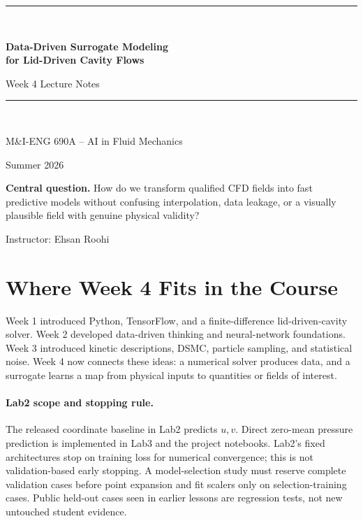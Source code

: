 \documentclass[11pt]{article}
\begin{document}
\begin{titlepage}
\centering
\vspace*{1.1cm}
{\color{black}\rule{\textwidth}{2pt}}\\[0.5cm]
{\Huge\bfseries Data-Driven Surrogate Modeling\\[0.18cm]
for Lid-Driven Cavity Flows\par}
\vspace{0.35cm}
{\Large Week 4 Lecture Notes\par}
\vspace{0.5cm}
{\color{black}\rule{\textwidth}{2pt}}\\[1.0cm]
{\Large M\&I-ENG 690A -- AI in Fluid Mechanics\par}
\vspace{0.3cm}
{\large Summer 2026\par}
\vfill
\begin{tcolorbox}[colback=lightblue,colframe=blue,width=0.92\textwidth]
\textbf{Central question.} How do we transform qualified CFD fields into fast predictive models without confusing interpolation, data leakage, or a visually plausible field with genuine physical validity?
\end{tcolorbox}
\vfill
{\large Instructor: Ehsan Roohi\par}
\end{titlepage}

\tableofcontents
\newpage

\section{Where Week 4 Fits in the Course}
Week 1 introduced Python, TensorFlow, and a finite-difference lid-driven-cavity solver. Week 2 developed data-driven thinking and neural-network foundations. Week 3 introduced kinetic descriptions, DSMC, particle sampling, and statistical noise. Week 4 now connects these ideas: a numerical solver produces data, and a surrogate learns a map from physical inputs to quantities or fields of interest.

\paragraph{Lab2 scope and stopping rule.}
The released coordinate baseline in Lab2 predicts $u,v$. Direct zero-mean pressure
prediction is implemented in Lab3 and the project notebooks. Lab2's fixed
architectures stop on training loss for numerical convergence; this is not
validation-based early stopping. A model-selection study must reserve complete
validation cases before point expansion and fit scalers only on selection-training
cases. Public held-out cases seen in earlier lessons are regression tests, not
new untouched student evidence.
\end{document}
